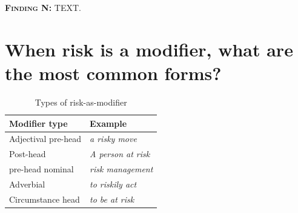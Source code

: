 



  \noindent\colorbox{yellow!20}{%
  \parbox{1\textwidth}{%
  \textsc{\textbf{Finding N:}} TEXT.}}

		\section{When risk is a modifier, what are the most common forms?} \label{sect:riskmod}
		\FloatBarrier

            \begin{table}
            \small
            \centering
            \begin{tabular}{|l|l|}
            \hline
            \textbf{Modifier type}       & \textbf{Example}          \\ \hline
            Adjectival pre-head & \emph{a risky move}     \\ \hline
            Post-head           & \emph{A person at risk} \\ \hline
            pre-head nominal    & \emph{risk management}  \\ \hline
            Adverbial           & \emph{to riskily act}   \\ \hline
            Circumstance head   & \emph{to be at risk }   \\ \hline
            \end{tabular}
            \caption{Types of risk-as-modifier}
            \label{tab:modriskwords}
            \end{table}

